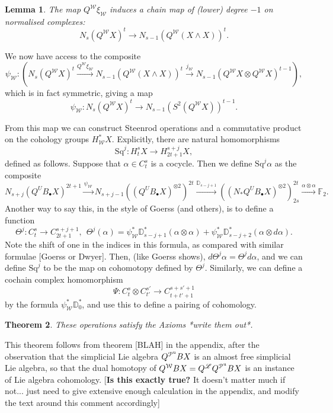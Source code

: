 \documentclass[11pt]{amsart}
\theoremstyle{plain}
\newtheorem{thm}{Theorem}[section]
\newtheorem{lem}[thm]{Lemma}
\theoremstyle{definition}
\renewcommand{\to}{\longrightarrow}
\newcommand{\scrL}{\mathscr{L}}
\newcommand{\calW}{\mathcal{W}}
\newcommand{\calP}{\mathcal{P}}
\newcommand{\calV}{\mathcal{V}}
\theoremstyle{plain}
\newcommand{\PMonad}{{\calP^\textup{u}}}
\newcommand{\Palg}{{\calP}}
\newcommand{\LieOperad}{{\scrL}}
\newcommand{\vect}[2]{\calV^{#1}_{#2}}
\newcommand{\Sq}{\mathrm{Sq}}
\newcommand{\F}{\mathbb{F}}
\begin{document}
\begin{Cohomology operations for unstable Lie algebras over P}
{\begin{lem}
The map $Q^\calW\xi_\calW$ induces a chain map of (lower) degree $-1$ on normalised complexes:
\[N_s(Q^{\calW}X)^t\to N_{s-1}(Q^{\calW}(X\wedge X))^t.\]
\end{lem}
We now have access to the composite
\[\psi_\calW:\left(N_s(Q^{\calW}X)^t\overset{Q^\calW\xi_\calW}{\to} N_{s-1}(Q^{\calW}(X\wedge X))^t\overset{j_\calW}{\to} N_{s-1}(Q^{\calW}X\otimes Q^\calW X)^{t-1}\right),\]
which is in fact symmetric, giving a map
\[\psi_{\calW}:N_s(Q^{\calW}X)^t\to N_{s-1}(S^2(Q^{\calW}X))^{t-1}.\]

From this map we can construct Steenrod operations and a commutative product on the cohology groups $H^*_\calW X$. Explicitly, there are natural homomorphisms
\[\Sq^j:H_t^{s}X\to H_{2t+1}^{s+j}X,\]
defined as follows. Suppose that $\alpha\in C_t^{s}$ is a cocycle. Then we define $\Sq^j\alpha$ as the composite
\[N_{s+j}(Q^UB_{\bullet}X)^{2t+1}\overset{\psi_\calW}{\to}N_{s+j-1}((Q^UB_{\bullet}X)^{\otimes2})^{2t}\overset{\mathbb{D}_{s-j+1}}{\to}
((N_*Q^UB_{\bullet}X)^{\otimes2})^{2t}_{2s}\overset{\alpha\otimes\alpha}{\to}\F_2.
\]
Another way to say this, in the style of Goerss (and others), is to define a function
\[\Theta^j:C_{t}^{s}\to C_{2t+1}^{s+j+1},\ \ \Theta^j(\alpha)=\psi^*_\calW\mathbb{D}_{s-j+1}^*(\alpha\otimes\alpha)+ \psi^*_\calW\mathbb{D}_{s-j+2}^*(\alpha\otimes d\alpha).\]
Note the shift of one in the indices in this formula, as compared with similar formulae [Goerss or Dwyer].
Then, (like Goerss shows), $d\Theta^j\alpha=\Theta^jd\alpha$, and we can define $\Sq^j$ to be the map on cohomotopy defined by $\Theta^j$. Similarly, we can define a cochain complex homomorphism
\[\Psi:C_t^{s}\otimes C_{t'}^{s'}\to C_{t+t'+1}^{s+s'+1}\]
by the formula $\psi^*_\calW\mathbb{D}_0^*$, and use this to define a pairing of cohomology.}
\begin{thm}
These operations satisfy the Axioms *write them out*.
\end{thm}
This theorem follows from theorem [BLAH] in the appendix, after the observation that 
the simplicial Lie algebra $Q^\PMonad B X$ is an almost free simplicial Lie algebra, so that the dual homotopy of $Q^\calW B X=Q^{\LieOperad} Q^\PMonad B X$ is an instance of Lie algebra cohomology. [\textbf{Is this exactly true?} It doesn't matter much if not... just need to give extensive enough calculation in the appendix, and modify the text around this comment accordingly]


\end{Cohomology operations for unstable Lie algebras over P}
\end{document}
